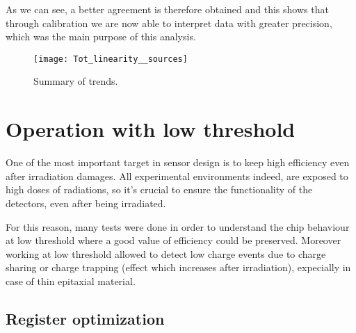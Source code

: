 As we can see, a better agreement is therefore obtained and this shows that through calibration we are now able to interpret data with greater precision, which was the main purpose of this analysis.

\begin{figure}[h!]
\centering
\texttt{[image: Tot\_linearity\_\_sources]}
\caption{Summary of trends.}
\label{inj_cap_sum}
\end{figure}


\section{Operation with low threshold}

One of the most important target in sensor design is to keep high efficiency even after irradiation damages. All experimental environments indeed, are exposed to high doses of radiations, so it's crucial to ensure the functionality of the detectors, even after being irradiated.

For this reason, many tests were done in order to understand the chip behaviour at low threshold where a good value of efficiency could be preserved.
Moreover working at low threshold allowed to detect low charge events due to charge sharing or charge trapping (effect which increases after irradiation), expecially in case of thin epitaxial material. 


\begin{comment}
4. Explored also different registers settings to operate the chip with lower THResholds
 	- important after radiation damage to run at low THR to keep the hit efficiency high
5. Discovered & investigated an important issue with cross talk, due to digital signal from the redout, showing up when running the chip with THR below ~ 250 e- 
hot pixel studied to understand which digital signal was responsible & mitigate the effect with different settings/bias

Explain the function of the various registers used (see Eleonora thesis, and maybe can 		add also some scope picture). 
	Register optimization (conversion???)
	Comparison with simulation 
	Can add at the end some nice picture of the optimized thr and tuning 

\end{comment}


\subsection{Register optimization}

